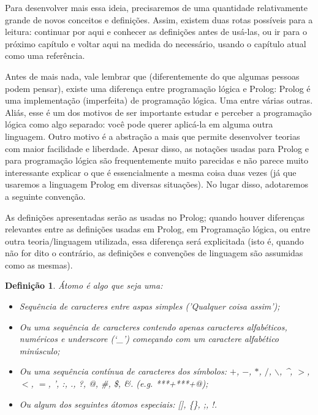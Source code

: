 \documentclass{article}
\newtheorem{definition}{Definição}[section]
\theoremstyle{remark}
\begin{document}
Para desenvolver mais essa ideia, precisaremos de uma quantidade relativamente grande de novos conceitos e definições. Assim, existem duas rotas possíveis para a leitura: continuar por aqui e conhecer as definições antes de usá-las, ou ir para o próximo capítulo e voltar aqui na medida do necessário, usando o capítulo atual como uma referência.


Antes de mais nada, vale lembrar que (diferentemente do que algumas pessoas podem pensar), existe uma diferença entre programação lógica e Prolog: Prolog é uma implementação (imperfeita) de programação lógica. Uma entre várias outras. Aliás, esse é um dos motivos de ser importante estudar e perceber a programação lógica como algo separado: você pode querer aplicá-la em alguma outra linguagem. Outro motivo é a abstração a mais que permite desenvolver teorias com maior facilidade e liberdade. Apesar
disso, as notações usadas para Prolog e para programação lógica são frequentemente muito parecidas e não parece muito interessante explicar o que é essencialmente a mesma coisa duas vezes (já que usaremos a linguagem Prolog em diversas situações). No lugar disso, adotaremos a seguinte convenção.

As definições apresentadas serão as usadas no Prolog; quando houver diferenças relevantes entre as definições usadas em Prolog, em Programação lógica, ou entre outra teoria/linguagem utilizada, essa diferença será explicitada (isto é, quando não for dito o contrário, as definições e convenções de linguagem são assumidas como as mesmas).


  \theoremstyle{definition}
  \begin{definition}{Átomo}
  é algo que seja uma:
    \begin{itemize}
      \item Sequência de caracteres entre aspas simples (\textit{'Qualquer coisa assim'});
      \item Ou uma sequência de caracteres contendo apenas caracteres alfabéticos, numéricos e \textit{underscore} (`\_') começando com um caractere alfabético minúsculo;
      \item Ou uma sequência contínua de caracteres dos símbolos: $+$, $-$, $*$, $/$, $\backslash$, \^{}, $>$, $<$, $=$, ', :, ., ?, @, \#, \$, \&. (e.g. ***+***+@);
      \item Ou algum dos seguintes átomos especiais: [], \{\}, ;, !.
    \end{itemize}
  \end{definition}
\end{document}
